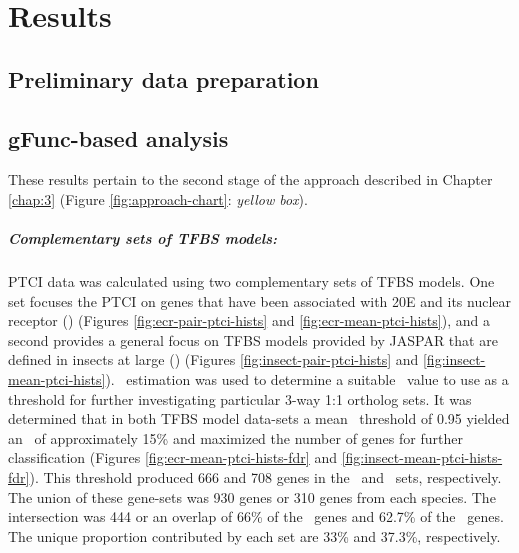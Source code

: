 

\chapter{Results} \label{chap:4}

\section{Preliminary data preparation}

\section{gFunc-based analysis}





These results pertain to the second stage of the approach described in Chapter \ref{chap:3} (Figure \ref{fig:approach-chart}: \textit{yellow box}).

\paragraph*{Complementary sets of TFBS models:}
\gls{PTCI} data was calculated using two complementary sets of \gls{TFBS} models.
%
One set focuses the \gls{PTCI} on genes that have been associated with \gls{20E} and its nuclear receptor (\PTCIe) (Figures \ref{fig:ecr-pair-ptci-hists} and \ref{fig:ecr-mean-ptci-hists}), and a second provides a general focus on \gls{TFBS} models provided by JASPAR that are defined in insects at large (\PTCIi) (Figures \ref{fig:insect-pair-ptci-hists} and \ref{fig:insect-mean-ptci-hists}).
%
\FDR\ estimation was used to determine a suitable \PTCI\ value to use as a threshold for further investigating particular 3-way 1:1 ortholog sets.
%
It was determined that in both \gls{TFBS} model data-sets a mean \PTCI\ threshold of 0.95 yielded an \FDR\ of approximately 15\% and maximized the number of genes for further classification (Figures \ref{fig:ecr-mean-ptci-hists-fdr} and \ref{fig:insect-mean-ptci-hists-fdr}).
%
This threshold produced 666 and 708 genes in the \PTCIi\ and \PTCIe\ sets, respectively.
%
The union of these gene-sets was 930 genes or 310 genes from each species.
%
The intersection was 444 or an overlap of 66\% of the \PTCIi\ genes and 62.7\% of the \PTCIe\ genes.
%
The unique proportion contributed by each set are 33\% and 37.3\%, respectively.

